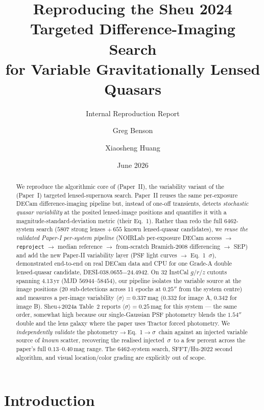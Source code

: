 \documentclass[11pt,letterpaper]{article}
\title{Reproducing the Sheu 2024 Targeted Difference-Imaging Search\\
       for Variable Gravitationally Lensed Quasars}
\author{Greg Benson \and Xiaosheng Huang}
\date{June 2026}
\newcommand{\sig}{\ensuremath{\sigma}}
\newcommand{\meansig}{\ensuremath{\langle\sigma\rangle}}
\newcommand{\target}{DESI-038.0655$-$24.4942}
\begin{document}
\maketitle
\subtitle{Internal Reproduction Report}

\begin{abstract}
We reproduce the algorithmic core of \citet{sheu2024variable} (Paper~II), the
variability variant of the \citet{sheu2023lensedsne} (Paper~I) targeted
lensed-supernova search. Paper~II reuses the same per-exposure DECam
difference-imaging pipeline but, instead of one-off transients, detects
\emph{stochastic quasar variability} at the posited lensed-image positions and
quantifies it with a magnitude-standard-deviation metric (their Eq.~1). Rather
than redo the full $6462$-system search ($5807$ strong lenses $+\,655$ known
lensed-quasar candidates), we \emph{reuse the validated Paper-I per-system
pipeline} (NOIRLab per-exposure DECam access $\to$ \texttt{reproject} $\to$
median reference $\to$ from-scratch Bramich-2008 differencing $\to$ SEP) and
add the new Paper-II variability layer (PSF light curves $\to$ Eq.~1~\sig),
demonstrated end-to-end on real DECam data and CPU for one Grade-A double
lensed-quasar candidate, \target. On $32$ InstCal $g/r/z$ cutouts spanning
$4.13$\,yr (MJD $56944$--$58454$), our pipeline isolates the variable source at
the image positions ($20$ sub-detections across $11$ epochs at $0.25''$ from
the system centre) and measures a per-image variability $\meansig = 0.337$\,mag
($0.332$ for image A, $0.342$ for image B). Sheu+2024a Table~2 reports
$\meansig = 0.25$\,mag for this system --- the same order, somewhat high
because our single-Gaussian PSF photometry blends the $1.54''$ double and the
lens galaxy where the paper uses Tractor forced photometry. We
\emph{independently validate} the photometry$\to$Eq.~1$\to$\sig\ chain against
an injected variable source of \emph{known} scatter, recovering the realised
injected~\sig\ to a few percent across the paper's full $0.13$--$0.40$\,mag
range. The $6462$-system search, SFFT/Hu-2022 second algorithm, and visual
location/color grading are explicitly out of scope.
\end{abstract}

\tableofcontents

\bigskip

\section{Introduction}
\end{document}
